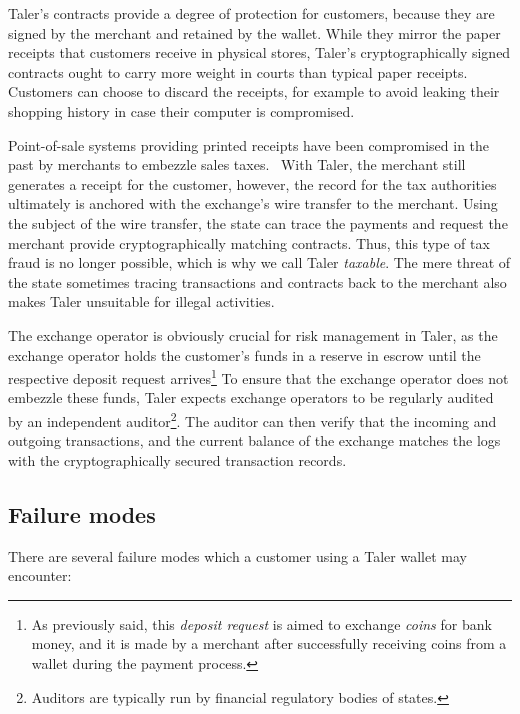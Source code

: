 \documentclass{llncs}
\begin{document}
Taler's contracts provide a degree of protection for customers,
because they are signed by the merchant and retained by the wallet.
While they mirror the paper receipts that customers receive in
physical stores, Taler's cryptographically signed contracts ought to
carry more weight in courts than typical paper receipts.  Customers
can choose to discard the receipts, for example to avoid leaking their
shopping history in case their computer is compromised.

Point-of-sale systems providing printed receipts have been compromised
in the past by merchants to embezzle sales
taxes.~\cite{munichicecream} With Taler, the merchant still generates
a receipt for the customer, however, the record for the tax
authorities ultimately is anchored with the exchange's wire transfer
to the merchant.  Using the subject of the wire transfer, the state
can trace the payments and request the merchant provide
cryptographically matching contracts.  Thus, this type of tax
fraud is no longer possible, which is why we call Taler {\em
taxable}.  The mere threat of the state sometimes tracing transactions
and contracts back to the merchant also makes Taler unsuitable for
illegal activities.

The exchange operator is obviously crucial for risk management in
Taler, as the exchange operator holds the customer's funds in a
reserve in escrow until the respective deposit request
arrives\footnote{As previously said, this {\it deposit request} is
  aimed to exchange {\it coins} for bank money, and it is made by a
  merchant after successfully receiving coins from a wallet during the
  payment process.} To ensure that the exchange operator does not
embezzle these funds, Taler expects exchange operators to be regularly
audited by an independent auditor\footnote{Auditors are typically run
  by financial regulatory bodies of states.}.  The auditor can then
verify that the incoming and outgoing transactions, and the current
balance of the exchange matches the logs with the cryptographically
secured transaction records.


\subsection{Failure modes}

There are several failure modes which a customer using a Taler wallet may
encounter:
\end{document}
